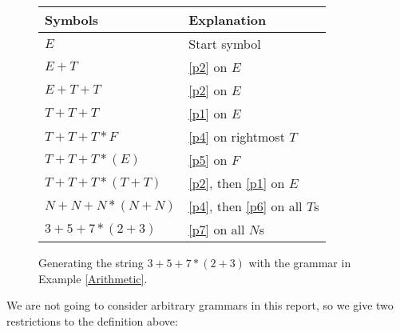 \begin{figure}
    \centering
    \begin{tabular}{l||l}
      Symbols & Explanation \\\hline
      $E$ & Start symbol \\\hline
      $E + T$ & \ref{p2} on $E$ \\\hline
      $E + T + T$ & \ref{p2} on $E$ \\\hline
      $T + T + T$ & \ref{p1} on $E$ \\\hline
      $T + T + T * F$ & \ref{p4} on rightmost $T$ \\\hline
      $T + T + T * (E)$ & \ref{p5} on $F$ \\\hline
      $T + T + T * (T + T)$ & \ref{p2}, then \ref{p1} on $E$ \\\hline
      $N + N + N * (N + N)$ & \ref{p4}, then \ref{p6} on all $T$s \\\hline
      $3 + 5 + 7 * (2 + 3)$ & \ref{p7} on all $N$s \\\hline
    \end{tabular}
    \caption{Generating the string $3+5+7*(2+3)$ with the grammar in Example \ref{Arithmetic}.\label{Str-Gen}}
  \end{figure}
We are not going to consider arbitrary grammars in this report, so we give two restrictions to the definition above: 
